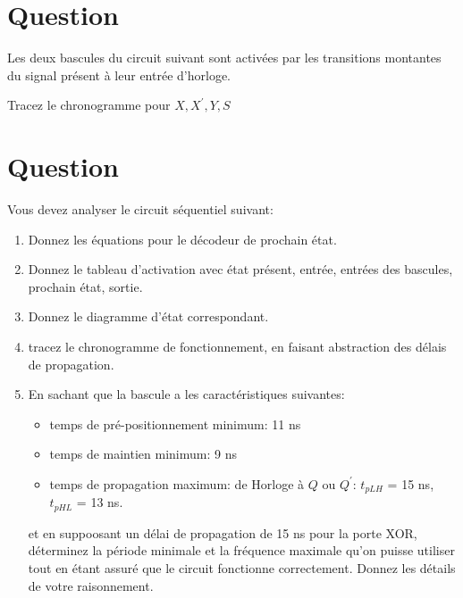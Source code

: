 \documentclass[letter, oneside]{book}
\begin{document}
\section*{Question}
\label{sec:org5efa832}
Les deux bascules du circuit suivant sont activées par les
   transitions montantes du signal présent à leur entrée
   d'horloge. 
   \begin{center}

\end{center}

Tracez le chronogramme pour \(X, X^\prime, Y, S\)

\section*{Question}
\label{sec:orgb7b1cf9}
Vous devez analyser le circuit séquentiel suivant:
\begin{center}

\end{center}

\begin{enumerate}
\item Donnez les équations pour le décodeur de prochain état.

\item Donnez le tableau d'activation avec état présent, entrée, entrées
des bascules, prochain état, sortie.

\item Donnez le diagramme d'état correspondant.

\item tracez le chronogramme de fonctionnement, en
faisant abstraction des délais de propagation.

\item En sachant que la bascule a les caractéristiques suivantes:

\begin{itemize}
\item temps de pré-positionnement minimum: 11 ns

\item temps de maintien minimum: 9 ns

\item temps de propagation maximum: de Horloge à \(Q\) ou
\(Q^{\prime}\): \(t_{pLH}\) = 15 ns, \(t_{pHL}\) = 13 ns.
\end{itemize}

et en suppoosant un délai de propagation de 15 ns pour la porte
XOR, déterminez la période minimale et la fréquence
maximale qu'on puisse utiliser tout en étant assuré que le circuit
fonctionne correctement. Donnez les détails de votre raisonnement.
\end{enumerate}
\end{document}
